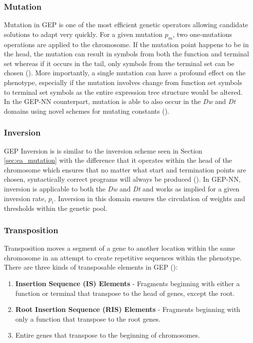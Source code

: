 \subsubsection{Mutation}
Mutation in GEP is one of the most efficient genetic operators allowing candidate solutions to adapt very quickly. For a given mutation $p_m$, two one-mutations operations are applied to the chromosome. If the mutation point happens to be in the head, the mutation can result in symbols from both the function and terminal set whereas if it occurs in the tail, only symbols from the terminal set can be chosen (\cite{ferreira2006gene}). More importantly, a single mutation can have a profound effect on the phenotype, especially if the mutation involves change from function set symbols to terminal set symbols as the entire expression tree structure would be altered. In the GEP-NN counterpart, mutation is able to also occur in the \textit{Dw} and \textit{Dt} domains using novel schemes for mutating constants (\cite{ferreira2006gene}).

\subsubsection{Inversion}
GEP Inversion is is similar to the inversion scheme seen in Section \ref{sec:ea_mutation} with the difference that it operates within the head of the chromosome which ensures that no matter what start and termination points are chosen, syntactically correct programs will always be produced (\cite{ferreira2006gene}). In GEP-NN, inversion is applicable to both the \textit{Dw} and \textit{Dt} and works as implied for a given inversion rate, \textit{$p_i$}. Inversion in this domain ensures the circulation of weights and thresholds within the genetic pool.

\subsubsection{Transposition}
Transposition moves a segment of a gene to another location within the same chromosome in an attempt to create repetitive sequences within the phenotype. There are three kinds of transposable elements in GEP (\cite{ferreira2006gene}):

\begin{enumerate}
    \item \textbf{Insertion Sequence (IS) Elements} - Fragments beginning with either a function or terminal that transpose to the head of genes, except the root.
    \item \textbf{Root Insertion Sequence (RIS) Elements} - Fragments beginning with only a function that transpose to the root genes.
    \item Entire genes that transpose to the beginning of chromosomes.
\end{enumerate}

